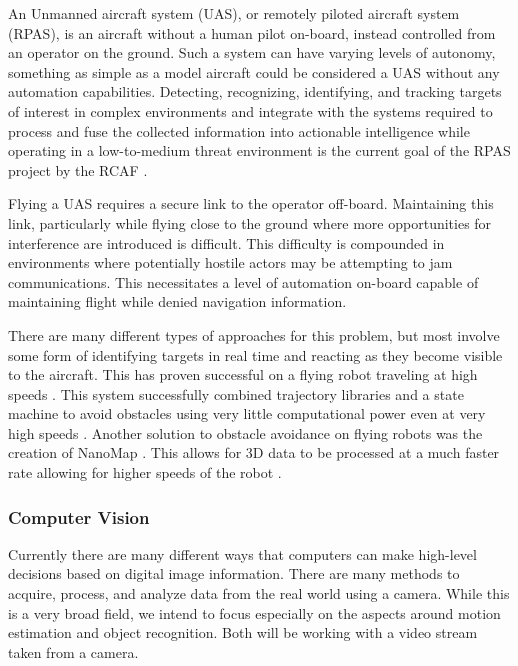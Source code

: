 \documentclass{article}
\begin{document}
		An Unmanned aircraft system (UAS), or remotely piloted aircraft system (RPAS), is an aircraft without a human pilot on-board, instead controlled from an operator on the ground. Such a system can have varying levels of autonomy, something as simple as a model aircraft could be considered a UAS without any automation capabilities. Detecting, recognizing, identifying, and tracking targets of interest in complex environments and integrate with the systems required to process and fuse the collected information into actionable intelligence while operating in a low-to-medium threat environment is the current goal of the RPAS project by the RCAF \cite{RPAS}. 
		
		Flying a UAS requires a secure link to the operator off-board. Maintaining this link, particularly while flying close to the ground where more opportunities for interference are introduced is difficult. This difficulty is compounded in environments where potentially hostile actors may be attempting to jam communications. This necessitates a level of automation on-board capable of maintaining flight while denied navigation information.
		
		There are many different types of approaches for this problem, but most involve some form of identifying targets in real time and reacting as they become visible to the aircraft. This has proven successful on a flying robot traveling at high speeds \cite{barry2015pushbroom}. This system successfully combined trajectory libraries and a state machine to avoid obstacles using very little computational power even at very high speeds \cite{barry2018high}. Another solution to obstacle avoidance on flying robots was the creation of NanoMap \cite{2018nanomap}. This allows for 3D data to be processed at a much faster rate allowing for higher speeds of the robot \cite{2018nanomap}.
		
		\subsubsection{Computer Vision}
		
		Currently there are many different ways that computers can make high-level decisions based on digital image information. There are many methods to acquire, process, and analyze data from the real world using a camera. While this is a very broad field, we intend to focus especially on the aspects around motion estimation and object recognition. Both will be working with a video stream taken from a camera. 
		
\end{document}
